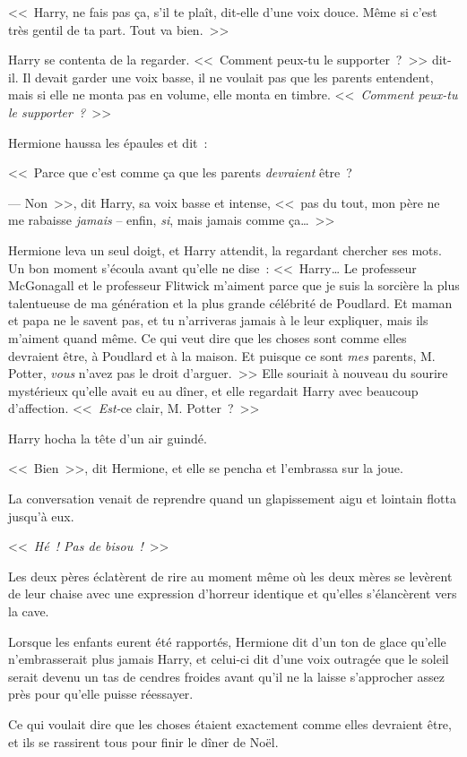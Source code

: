 <<~Harry, ne fais pas ça, s'il te plaît, dit-elle d'une voix douce. Même si c'est très gentil de ta part. Tout va bien.~>>

Harry se contenta de la regarder. <<~Comment peux-tu le supporter~?~>> dit-il. Il devait garder une voix basse, il ne voulait pas que les parents entendent, mais si elle ne monta pas en volume, elle monta en timbre. <<~\emph{Comment peux-tu le supporter~?}~>>

Hermione haussa les épaules et dit~:

<<~Parce que c'est comme ça que les parents \emph{devraient} être~?

--- Non~>>, dit Harry, sa voix basse et intense, <<~pas du tout, mon père ne me rabaisse \emph{jamais} -- enfin, \emph{si}, mais jamais comme ça…~>>

Hermione leva un seul doigt, et Harry attendit, la regardant chercher ses mots. Un bon moment s'écoula avant qu'elle ne dise~: <<~Harry… Le professeur McGonagall et le professeur Flitwick m'aiment parce que je suis la sorcière la plus talentueuse de ma génération et la plus grande célébrité de Poudlard. Et maman et papa ne le savent pas, et tu n'arriveras jamais à le leur expliquer, mais ils m'aiment quand même. Ce qui veut dire que les choses sont comme elles devraient être, à Poudlard et à la maison. Et puisque ce sont \emph{mes} parents, M. Potter, \emph{vous} n'avez pas le droit d'arguer.~>> Elle souriait à nouveau du sourire mystérieux qu'elle avait eu au dîner, et elle regardait Harry avec beaucoup d'affection. <<~\emph{Est-}ce clair, M. Potter~?~>>

Harry hocha la tête d'un air guindé.

<<~Bien~>>, dit Hermione, et elle se pencha et l'embrassa sur la joue.

\later

La conversation venait de reprendre quand un glapissement aigu et lointain flotta jusqu'à eux.

<<~\emph{Hé~! Pas de bisou~!}~>>

Les deux pères éclatèrent de rire au moment même où les deux mères se levèrent de leur chaise avec une expression d'horreur identique et qu'elles s'élancèrent vers la cave.

Lorsque les enfants eurent été rapportés, Hermione dit d'un ton de glace qu'elle n'embrasserait plus jamais Harry, et celui-ci dit d'une voix outragée que le soleil serait devenu un tas de cendres froides avant qu'il ne la laisse s'approcher assez près pour qu'elle puisse réessayer.

Ce qui voulait dire que les choses étaient exactement comme elles devraient être, et ils se rassirent tous pour finir le dîner de Noël.


